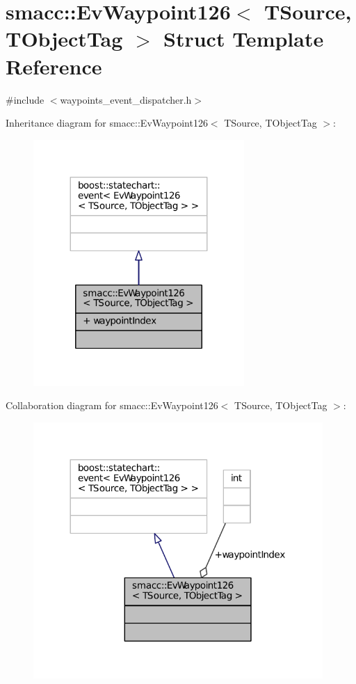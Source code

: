 \hypertarget{structsmacc_1_1EvWaypoint126}{}\section{smacc\+:\+:Ev\+Waypoint126$<$ T\+Source, T\+Object\+Tag $>$ Struct Template Reference}
\label{structsmacc_1_1EvWaypoint126}


{\ttfamily \#include $<$waypoints\+\_\+event\+\_\+dispatcher.\+h$>$}



Inheritance diagram for smacc\+:\+:Ev\+Waypoint126$<$ T\+Source, T\+Object\+Tag $>$\+:
\nopagebreak
\begin{figure}[H]
\begin{center}
\leavevmode
\includegraphics[width=227pt]{structsmacc_1_1EvWaypoint126__inherit__graph}
\end{center}
\end{figure}


Collaboration diagram for smacc\+:\+:Ev\+Waypoint126$<$ T\+Source, T\+Object\+Tag $>$\+:
\nopagebreak
\begin{figure}[H]
\begin{center}
\leavevmode
\includegraphics[width=312pt]{structsmacc_1_1EvWaypoint126__coll__graph}
\end{center}
\end{figure}
